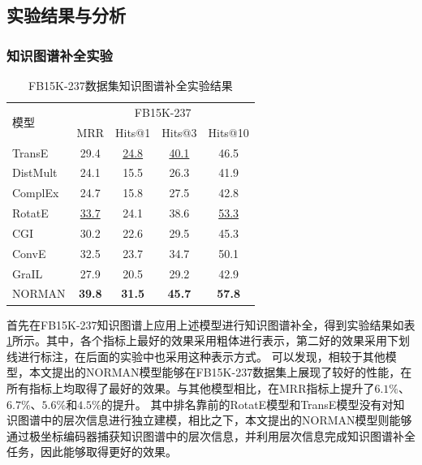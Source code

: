 \documentclass[algorithmlist, AutoFakeBold, AutoFakeSlant, figurelist, tablelist, nomlist, engineering, openany]{seuthesix} %
\begin{document}
\subsection{实验结果与分析}
\subsubsection{知识图谱补全实验}
\begin{table}[t]
  \centering
  \caption{FB15K-237数据集知识图谱补全实验结果}
  \begin{tabular*}{0.95\textwidth}{@{\extracolsep{\fill}}lcccc}
    \toprule[1pt]
    \multirow{2}{*}{模型} & \multicolumn{4}{c}{FB15K-237} \\
      & MRR & Hits@1 & Hits@3 & Hits@10 \\ \hline
    TransE & 29.4 & \underline{24.8} & \underline{40.1} & 46.5 \\
    DistMult & 24.1 & 15.5 & 26.3 & 41.9 \\
    ComplEx & 24.7 & 15.8 & 27.5 & 42.8 \\
    RotatE & \underline{33.7} & 24.1 & 38.6  & \underline{53.3} \\
    CGI & 30.2 & 22.6 & 29.5 & 45.3 \\
    ConvE & 32.5 & 23.7 & 34.7 & 50.1 \\
    GraIL & 27.9 & 20.5 & 29.2 & 42.9 \\
    NORMAN & \textbf{39.8} & \textbf{31.5} & \textbf{45.7} & \textbf{57.8} \\
    \bottomrule[1pt]
  \end{tabular*}
  \label{Experiment1_FB15K-237}
\end{table}

首先在FB15K-237知识图谱上应用上述模型进行知识图谱补全，得到实验结果如表\ref{Experiment1_FB15K-237}所示。其中，各个指标上最好的效果采用粗体进行表示，第二好的效果采用下划线进行标注，在后面的实验中也采用这种表示方式。
可以发现，相较于其他模型，本文提出的NORMAN模型能够在FB15K-237数据集上展现了较好的性能，在所有指标上均取得了最好的效果。与其他模型相比，在MRR指标上提升了$6.1\%$、$6.7\%$、$5.6\%$和$4.5\%$的提升。
其中排名靠前的RotatE模型和TransE模型没有对知识图谱中的层次信息进行独立建模，相比之下，本文提出的NORMAN模型则能够通过极坐标编码器捕获知识图谱中的层次信息，并利用层次信息完成知识图谱补全任务，因此能够取得更好的效果。
\end{document}
